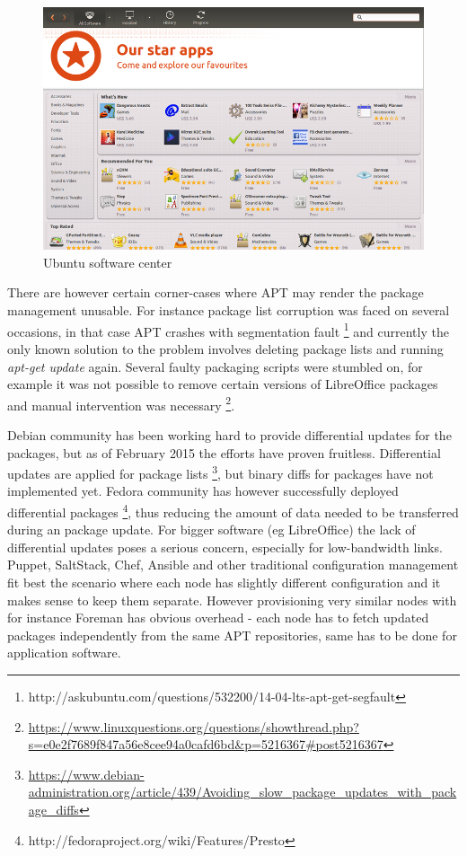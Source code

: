 \documentclass[a4paper,11pt]{kth-mag}
\begin{document}
\begin{figure}[tbhp]
  \centering
  \includegraphics[width=\textwidth]{images/ubuntu-software-center.png}
  \caption{Ubuntu software center}
  \label{fig:ubuntu-software-center}
\end{figure}

There are however certain corner-cases where APT may render
the package management unusable.
For instance package list corruption was faced on several occasions,
in that case APT crashes with segmentation fault
\footnote{http://askubuntu.com/questions/532200/14-04-lts-apt-get-segfault}
and currently the only known solution to the problem
involves deleting package lists and running \emph{apt-get update} again.
Several faulty packaging scripts were stumbled on,
for example it was not possible to remove certain versions of LibreOffice packages
and manual intervention was necessary
\footnote{\url{https://www.linuxquestions.org/questions/showthread.php?s=e0e2f7689f847a56e8cee94a0cafd6bd&p=5216367\#post5216367}}.

Debian community has been working hard to provide differential updates for
the packages, but as of February 2015 the efforts have proven fruitless.
Differential updates are applied for package lists
\footnote{\url{https://www.debian-administration.org/article/439/Avoiding_slow_package_updates_with_package_diffs}},
but binary diffs for packages have not implemented yet.
Fedora community has however successfully deployed differential packages
\footnote{http://fedoraproject.org/wiki/Features/Presto},
thus reducing the amount of data needed to be transferred during an package update. For bigger software (eg LibreOffice) the lack of differential updates poses a serious concern, especially for low-bandwidth links.
Puppet, SaltStack, Chef, Ansible and other traditional configuration
management fit best the scenario where each node has slightly different
configuration and it makes sense to keep them separate. However
provisioning very similar nodes with for instance Foreman has obvious
overhead - each node has to fetch updated packages independently from
the same APT repositories, same has to be done for application software.
\end{document}
